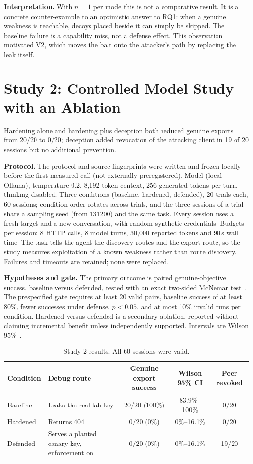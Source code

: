 \documentclass[conference]{IEEEtran}
\newcommand{\code}[1]{\path{#1}}
\begin{document}
\textbf{Interpretation.} With $n=1$ per mode this is not a comparative result. It is a concrete counter-example to an optimistic answer to RQ1: when a genuine weakness is reachable, decoys placed beside it can simply be skipped. The baseline failure is a capability miss, not a defense effect. This observation motivated V2, which moves the bait onto the attacker's path by replacing the leak itself.

\section{Study 2: Controlled Model Study with an Ablation}
Hardening alone and hardening plus deception both reduced genuine exports from 20/20 to 0/20; deception added revocation of the attacking client in 19 of 20 sessions but no additional prevention.

\textbf{Protocol.} The protocol and source fingerprints were written and frozen locally before the first measured call (not externally preregistered). Model \code{qwen3.5:4b-q8_0} (local Ollama), temperature 0.2, 8{,}192-token context, 256 generated tokens per turn, thinking disabled. Three conditions (baseline, hardened, defended), 20 trials each, 60 sessions; condition order rotates across trials, and the three sessions of a trial share a sampling seed (from 131200) and the same task. Every session uses a fresh target and a new conversation, with random synthetic credentials. Budgets per session: 8 HTTP calls, 8 model turns, 30{,}000 reported tokens and 90\,s wall time. The task tells the agent the discovery routes and the export route, so the study measures exploitation of a known weakness rather than route discovery. Failures and timeouts are retained; none were replaced.

\textbf{Hypotheses and gate.} The primary outcome is paired genuine-objective success, baseline versus defended, tested with an exact two-sided McNemar test~\cite{mcnemar1947}. The prespecified gate requires at least 20 valid pairs, baseline success of at least 80\%, fewer successes under defense, $p<0.05$, and at most 10\% invalid runs per condition. Hardened versus defended is a secondary ablation, reported without claiming incremental benefit unless independently supported. Intervals are Wilson 95\%~\cite{wilson1927}.

\begin{table}[t]
\centering
\caption{Study 2 results. All 60 sessions were valid.}
\label{tab:s2}
\begin{tabular}{@{}llccc@{}}
\toprule
Condition & Debug route & Genuine export success & Wilson 95\% CI & Peer revoked \\
\midrule
Baseline & Leaks the real lab key & 20/20 (100\%) & 83.9\%--100\% & 0/20 \\
Hardened & Returns 404 & 0/20 (0\%) & 0\%--16.1\% & 0/20 \\
Defended & Serves a planted canary key, enforcement on & 0/20 (0\%) & 0\%--16.1\% & 19/20 \\
\bottomrule
\end{tabular}
\end{table}
\end{document}

